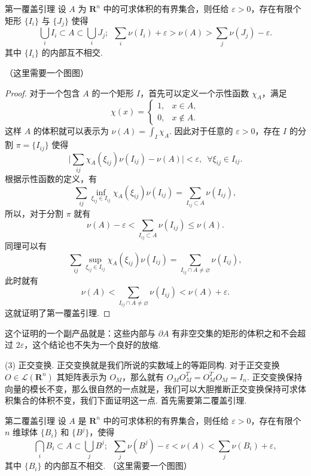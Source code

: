 \begin{lemma}{第一覆盖引理}{}
    设 $A$ 为 $\mathbf{R}^n$ 中的可求体积的有界集合，则任给 $\varepsilon > 0$，存在有限个矩形 $\{I_i\}$ 与 $\{J_j\}$ 使得
    \[\bigcup_i I_i\subset A\subset \bigcup_i J_j; \enspace \sum_i \nu(I_i) + \varepsilon > \nu(A) > \sum_j \nu(J_j) - \varepsilon.\]
    其中 $\{I_i\}$ 的内部互不相交.

    （这里需要一个图图）
\end{lemma}

\begin{proof}
    对于一个包含 $A$ 的一个矩形 $I$，首先可以定义一个示性函数 $\chi_A$，满足
    \[\chi(x) = \begin{cases}
        1, & x\in A,\\
        0, & x\notin A.
    \end{cases}\]
    这样 $A$ 的体积就可以表示为 $\nu(A) = \displaystyle\int_I\chi_A$. 因此对于任意的 $\varepsilon >0$，存在 $I$ 的分割 $\pi = \{I_{ij}\}$ 使得\[\lvert \sum_{ij}\chi_A(\xi_{ij})\nu(I_{ij}) - \nu(A)\rvert < \varepsilon,\enspace \forall \xi_{ij}\in I_{ij}.\]
    根据示性函数的定义，有 \[\sum_{ij}\inf_{\xi_{ij}\in I_{ij}}\chi_A(\xi_{ij})\nu(I_{ij}) = \sum_{I_{ij}\subset A}\nu(I_{ij}),\]
    所以，对于分割 $\pi$ 就有 \[\nu(A) - \varepsilon < \sum_{I_{ij}\subset A}\nu(I_{ij}) \leqslant \nu(A).\]
    同理可以有 \[\sum_{ij}\sup_{\xi_{ij}\in I_{ij}}\chi_A(\xi_{ij})\nu(I_{ij}) = \sum_{I_{ij}\cap A\neq \varnothing}\nu(I_{ij}),\]
    此时就有 \[\nu(A) < \sum_{I_{ij}\cap A\neq \varnothing}\nu(I_{ij}) < \nu(A) + \varepsilon.\]
    这就证明了第一覆盖引理.
\end{proof}

这个证明的一个副产品就是：这些内部与 $\partial A$ 有非空交集的矩形的体积之和不会超过 $2\varepsilon$，这个结论也不失为一个良好的放缩.

(3) 正交变换. 正交变换就是我们所说的实数域上的等距同构. 对于正交变换 $O\in \mathcal{L}(\mathbf{R}^n)$ 其矩阵表示为 $O_M$，那么就有 $O_MO^T_M = O_M^TO_M = I_n$. 正交变换保持向量的模长不变，那么很自然的一点就是，我们可以大胆推断正交变换保持可求体积集合的体积不变，我们下面证明这一点. 首先需要第二覆盖引理.

\begin{lemma}{第二覆盖引理}{}
    设 $A$ 是 $\mathbf{R}^n$ 中的可求体积的有界集合，则任给 $\varepsilon>0$，存在有限个 $n$ 维球体 $\{B_i\}$ 和 $\{B^j\}$，使得 \[\bigcap_iB_i\subset A \subset \bigcup_jB^j;\enspace \sum_j\nu(B^j) - \varepsilon < \nu(A) < \sum_j\nu(B_i) + \varepsilon,\]
    其中 $\{B_i\}$ 的内部互不相交.
    （这里需要一个图图）
\end{lemma}

